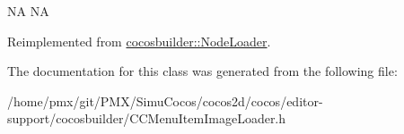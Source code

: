 NA  NA 

Reimplemented from \hyperlink{classcocosbuilder_1_1NodeLoader}{cocosbuilder\+::\+Node\+Loader}.



The documentation for this class was generated from the following file\+:\begin{DoxyCompactItemize}
\item 
/home/pmx/git/\+P\+M\+X/\+Simu\+Cocos/cocos2d/cocos/editor-\/support/cocosbuilder/C\+C\+Menu\+Item\+Image\+Loader.\+h\end{DoxyCompactItemize}
